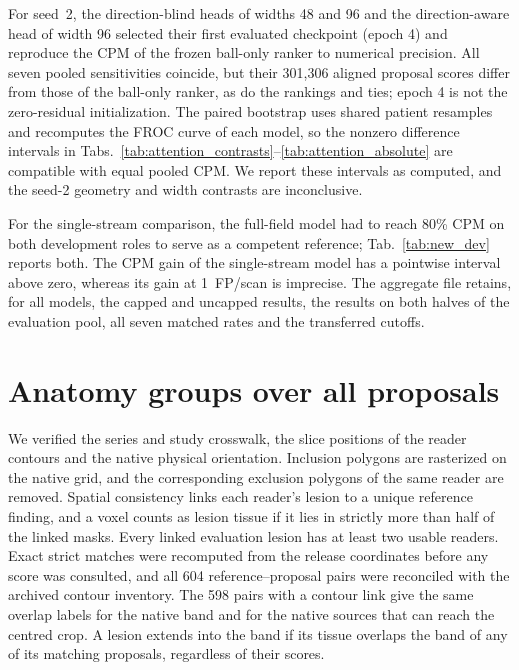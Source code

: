 For seed~2, the direction-blind heads of widths 48 and 96 and the direction-aware head of width 96 selected their first evaluated checkpoint (epoch 4) and reproduce the CPM of the frozen ball-only ranker to numerical precision. All seven pooled sensitivities coincide, but their 301,306 aligned proposal scores differ from those of the ball-only ranker, as do the rankings and ties; epoch 4 is not the zero-residual initialization. The paired bootstrap uses shared patient resamples and recomputes the FROC curve of each model, so the nonzero difference intervals in Tabs.~\ref{tab:attention_contrasts}--\ref{tab:attention_absolute} are compatible with equal pooled CPM. We report these intervals as computed, and the seed-2 geometry and width contrasts are inconclusive.

For the single-stream comparison, the full-field model had to reach 80\% CPM on both development roles to serve as a competent reference; Tab.~\ref{tab:new_dev} reports both. The CPM gain of the single-stream model has a pointwise interval above zero, whereas its gain at 1~FP/scan is imprecise. The aggregate file retains, for all models, the capped and uncapped results, the results on both halves of the evaluation pool, all seven matched rates and the transferred cutoffs.

\section{Anatomy groups over all proposals}
\label{supp:contour}

We verified the series and study crosswalk, the slice positions of the reader contours and the native physical orientation. Inclusion polygons are rasterized on the native grid, and the corresponding exclusion polygons of the same reader are removed. Spatial consistency links each reader's lesion to a unique reference finding, and a voxel counts as lesion tissue if it lies in strictly more than half of the linked masks. Every linked evaluation lesion has at least two usable readers. Exact strict matches were recomputed from the release coordinates before any score was consulted, and all 604 reference--proposal pairs were reconciled with the archived contour inventory. The 598 pairs with a contour link give the same overlap labels for the native band and for the native sources that can reach the centred crop. A lesion extends into the band if its tissue overlaps the band of any of its matching proposals, regardless of their scores.


